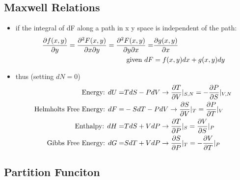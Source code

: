 \subsection*{Maxwell Relations}
\begin{itemize}
	\item if the integral of dF along a path in x y space is independent of the path:
	      \begin{align*}
		      \pdv{f(x,y)}{y} = \pdv{F(x,y)}{x}{y} = \pdv{F(x,y)}{y}{x} = & \pdv{g(x,y)}{x}       \\
		      \text{given } dF                                            & = f(x,y)dx + g(x,y)dy
	      \end{align*}
	\item thus (setting $dN = 0$)
	      \begin{align*}
		      \text{Energy: } dU =                & T dS - PdV \rightarrow \pdv{T}{V}|_{S,N} = - \pdv{P}{S}|_{V,N} \\
		      \text{Helmholts Free Energy: } dF = & -S dT - P dV \rightarrow \pdv{S}{V}|_T = \pdv{P}{T}|_V         \\
		      \text{Enthalpy: } dH =              & T dS + V dP \rightarrow \pdv{T}{P}|_S = \pdv{V}{S}|_P          \\
		      \text{Gibbs Free Energy: } dG =     & S dT + V dP  \rightarrow \pdv{S}{P}|_T = - \pdv{V}{T}|_P
	      \end{align*}

\end{itemize}

\subsection*{Partition Funciton}
